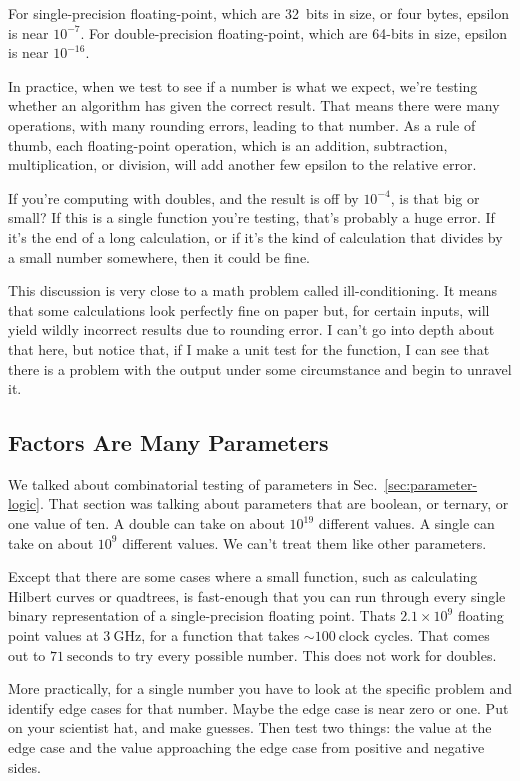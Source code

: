 \documentclass[fleqn,10pt]{olplainarticle}
\begin{document}
For single-precision floating-point, which are 32~bits in size,
or four bytes, epsilon is near $10^{-7}$. For double-precision
floating-point, which are 64-bits in size, epsilon is near
$10^{-16}$.

In practice, when we test to see if a number is what we expect,
we're testing whether an algorithm has given the correct result.
That means there were many operations, with many rounding errors,
leading to that number. As a rule of thumb, each floating-point
operation, which is an addition, subtraction, multiplication,
or division, will add another few epsilon to the relative error.

If you're computing with doubles, and the result is off by $10^{-4}$,
is that big or small? If this is a single function you're testing,
that's probably a huge error. If it's the end of a long calculation,
or if it's the kind of calculation that divides by a small number somewhere,
then it could be fine.

This discussion is very close to a math problem called ill-conditioning.
It means that some calculations look perfectly fine on paper
but, for certain inputs, will yield wildly incorrect results due
to rounding error. I can't go into depth about that here, but notice
that, if I make a unit test for the function, I can see that there
is a problem with the output under some circumstance and begin 
to unravel it.


\subsection{Factors Are Many Parameters}
We talked about combinatorial testing of parameters
in Sec.~\ref{sec:parameter-logic}. That section was talking about
parameters that are boolean, or ternary, or one value of ten.
A double can take on about $10^19$ different values. A single
can take on about $10^9$ different values. We can't treat them
like other parameters.

Except that there are some cases where a small function,
such as calculating Hilbert curves or quadtrees, is fast-enough
that you can run through every single binary representation of
a single-precision floating point. Thats $2.1\times 10^9$ floating
point values at $3\:\mbox{GHz}$, for a function that takes
$\sim 100\:\mbox{clock cycles}$. That comes out to $71\:\mbox{seconds}$
to try every possible number. This does not work for doubles.

More practically, for a single number you have to look at
the specific problem and identify edge cases for that number.
Maybe the edge case is near zero or one. Put on your scientist
hat, and make guesses. Then test two things: the value at the
edge case and the value approaching the edge case from positive
and negative sides.
\end{document}
